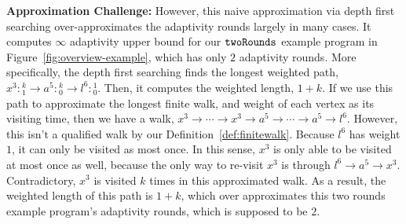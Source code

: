 \textbf{Approximation Challenge:}
However, this naive approximation via depth first searching over-approximates the adaptivity rounds largely in many cases.
It computes $\infty$ adaptivity upper bound for our $\mathtt{twoRounds}$ example program in Figure~\ref{fig:overview-example}, which has only $2$ adaptivity rounds.
More specifically, the depth first searching finds the longest weighted path,
$x^3 : {}^{k}_{1} \to a^5 : {}^{k}_{0} \to l^6 : {}^{1}_{0}$.
Then, it computes the weighted length, $1 + k$.
If we use this path to approximate the longest finite walk, and weight of each vertex as
its visiting time, then we have a walk, $x^3 \to \cdots \to x^3 \to a^5 \to \cdots \to a^5 \to l^6$.
However, this isn't a qualified walk by our Definition~\ref{def:finitewalk}.
Because $l^6$ has weight $1$, it can only be visited as most once. In this sense,
$x^3$ is only able to be visited at most once as well, because the only way to re-visit $x^3$ is through $l^6 \to a^5 \to x^3$.
%
Contradictory, $x^3$ is visited $k$ times in this approximated walk.
As a result,
the weighted length of this path is $1 + k$, which
over approximates 
this two rounds example program's adaptivity rounds, which is supposed to be $2$. 

